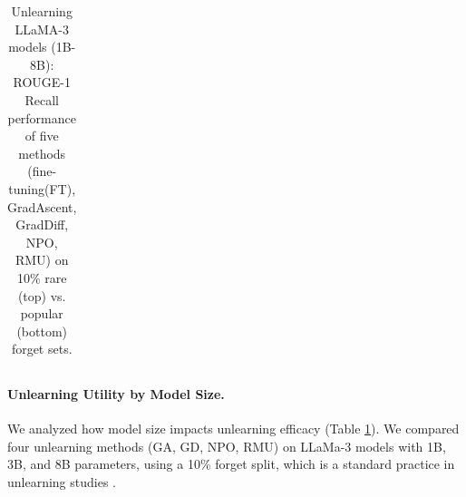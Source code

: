 \begin{table}[t]
{\begin{tabular}{|l|c|c|c|c|c|c|c|c|c|c|c|c|c|c|c|}
\hline
\end{tabular}
}
\caption{
Unlearning LLaMA-3 models (1B-8B): ROUGE-1 Recall performance of five methods (fine-tuning(FT), GradAscent, GradDiff, NPO, RMU) on 10\% rare (top) vs. popular (bottom) forget sets.
}
\label{tab:size_unlearning}
\end{table}


\begin{table}[t]
\centering
\small
\setlength{\tabcolsep}{3pt}
\caption{LLMs Performance After 10\% Data Unlearning – Comparative MMLU and HellaSwag Benchmarks on Rare vs Popular Splits}
\label{tab:llm_bench10}
\end{table}

\paragraph{Unlearning Utility by Model Size.}
We analyzed how model size impacts unlearning efficacy (Table \ref{tab:size_unlearning}). We compared four unlearning methods (GA, GD, NPO, RMU) on LLaMa-3 models with 1B, 3B, and 8B parameters, using a 10\% forget split, which is a standard practice in unlearning studies \cite{tofu2024, pal2025llm}.

